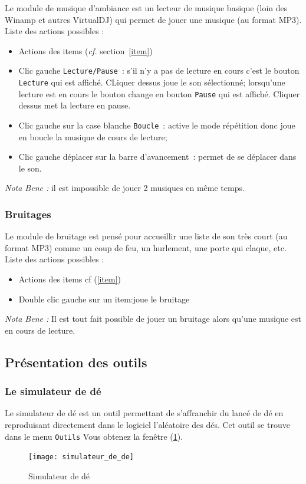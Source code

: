 \documentclass[a4paper,12pt]{article}
\newcommand*{\interfaceitem}[1]{\texttt{#1}}
\begin{document}
Le module de musique d'ambiance est un lecteur de musique basique (loin des Winamp et autres VirtualDJ) qui permet de jouer une musique (au format MP3).
\\
Liste des actions possibles :
\begin{itemize}
    \item Actions des items (\emph{cf.} section~\ref{item})
    \item Clic gauche \interfaceitem{Lecture/Pause}~: s'il n'y a pas de lecture en cours c'est le bouton \interfaceitem{Lecture} qui est affiché. CLiquer dessus joue le son sélectionné; lorsqu'une lecture est en cours le bouton change en bouton \interfaceitem{Pause} qui est affiché. Cliquer dessus met la lecture en pause.
    \item Clic gauche sur la case blanche \interfaceitem{Boucle}~: active le mode répétition donc joue en boucle la musique de cours de lecture;
    \item Clic gauche déplacer sur la barre d'avancement~: permet de se déplacer dans le son.
\end{itemize}
\emph{Nota Bene :} il est impossible de jouer 2 musiques en même temps.

\subsubsection{Bruitages}
\label{sec:bruitages}

Le module de bruitage est pensé pour accueillir une liste de son très court (au format MP3) comme un coup de feu, un hurlement, une porte qui claque, etc.
\\
Liste des actions possibles :
\begin{itemize}
    \item Actions des items cf (\ref{item})
    \item Double clic gauche sur un item:joue le bruitage
\end{itemize}

\emph{Nota Bene :} Il est tout fait possible de jouer un bruitage alors qu'une musique est en cours de lecture.

\subsection{Présentation des outils}
\label{sec:outils}

\subsubsection{Le simulateur de dé}
Le simulateur de dé est un outil permettant de s'affranchir du lancé de dé en reproduisant directement dans le logiciel l'aléatoire des dés.
Cet outil se trouve dans le menu \interfaceitem{Outils}
Vous obtenez la fenêtre (\ref{simulateur_de}).
\begin{figure}[h]
    \texttt{[image: simulateur\_de\_de]}
    \caption{Simulateur de dé}
    \label{simulateur_de}
\end{figure}
\end{document}
